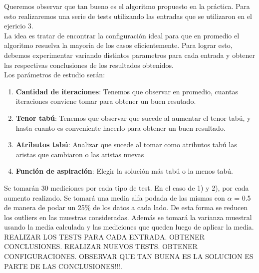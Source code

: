 Queremos observar que tan bueno es el algoritmo propuesto en la práctica. Para esto realizaremos una serie de tests utilizando las entradas que se utilizaron en el ejericio 3. \\
La idea es tratar de encontrar la configuración ideal para que en promedio el algoritmo resuelva la mayoria de los casos eficientemente. Para lograr esto, debemos experimentar variando distintos parametros para cada entrada y obtener las respectivas conclusiones de los resultados obtenidos.\\
Los parámetros de estudio serán:

\begin{enumerate}
\item  \textbf{Cantidad de iteraciones}: Tenemos que observar en promedio, cuantas iteraciones conviene tomar para obtener un buen resutado.
\item \textbf{Tenor tabú}: Tenemos que observar que sucede al aumentar el tenor tabú, y hasta cuanto es conveniente hacerlo para obtener un buen resultado.
\item \textbf{Atributos tabú}: Analizar que sucede al tomar como atributos tabú las aristas que cambiaron o las aristas nuevas
\item \textbf{Función de aspiración}: Elegir la solución más tabú o la menos tabú.
\end{enumerate}

Se tomarán 30 mediciones por cada tipo de test. En el caso de 1) y 2), por cada aumento realizado. Se tomará una media alfa podada de las mismas con $\alpha$ = 0.5 de manera de podar un 25\% de los datos a cada lado. De esta forma se reducen los outliers en las muestras consideradas. 
Además se tomará la varianza muestral usando la media calculada y las mediciones que queden luego de aplicar la media.\\

REALIZAR LOS TESTS PARA CADA ENTRADA. OBTENER CONCLUSIONES. REALIZAR NUEVOS TESTS. OBTENER CONFIGURACIONES. OBSERVAR QUE TAN BUENA ES LA SOLUCION ES PARTE DE LAS CONCLUSIONES!!!.
